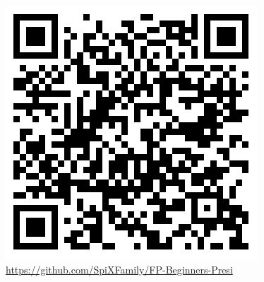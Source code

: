\documentclass{beamer}
\begin{document}
\begin{frame}
 \begin{figure}
    \centering
    \includegraphics[width=0.5\linewidth]{bilder/git-GI.png}
\textmd{\url{https://github.com/SpiXFamily/FP-Beginners-Presi}}
\end{figure}
\end{frame}
\end{document}
